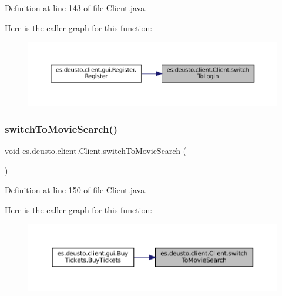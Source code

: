 Definition at line 143 of file Client.\+java.

Here is the caller graph for this function\+:
\nopagebreak
\begin{figure}[H]
\begin{center}
\leavevmode
\includegraphics[width=350pt]{classes_1_1deusto_1_1client_1_1_client_a66fff847d9f168900f6992fd4eff5e3d_icgraph}
\end{center}
\end{figure}
\mbox{\label{classes_1_1deusto_1_1client_1_1_client_a7cf818fce703324d74c896d9e4149dbe}} 
\subsubsection{\texorpdfstring{switchToMovieSearch()}{switchToMovieSearch()}}
{\footnotesize\ttfamily void es.\+deusto.\+client.\+Client.\+switch\+To\+Movie\+Search (\begin{DoxyParamCaption}{ }\end{DoxyParamCaption})}



Definition at line 150 of file Client.\+java.

Here is the caller graph for this function\+:
\nopagebreak
\begin{figure}[H]
\begin{center}
\leavevmode
\includegraphics[width=350pt]{classes_1_1deusto_1_1client_1_1_client_a7cf818fce703324d74c896d9e4149dbe_icgraph}
\end{center}
\end{figure}
\mbox{\label{classes_1_1deusto_1_1client_1_1_client_a8b292db7d6ec16eaa53b224bb7a33ab4}} 
